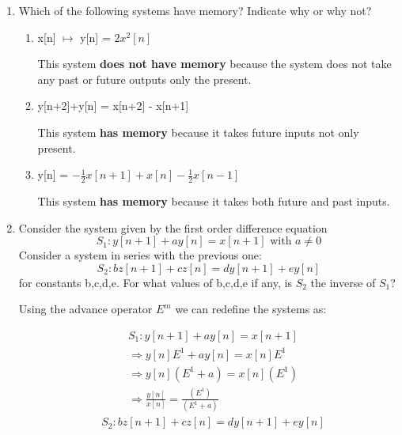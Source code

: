 \documentclass{article}
\begin{document}
\begin{enumerate}
    \item Which of the following systems have memory? Indicate why or why not?
    \begin{enumerate}
        \item x[n] $\mapsto$ y[n] = $2x^2[n]$
        \begin{center}
            This system \textbf{does not have memory} because the system does not take any past or future outputs only the present.
        \end{center}
        \item y[n+2]+y[n] = x[n+2] - x[n+1]
        \begin{center}
            This system \textbf{has memory} because it takes future inputs not only present.
        \end{center}
        \item y[n] = $-\frac{1}{2}x[n+1] +x[n] -\frac{1}{2}x[n-1]$
        \begin{center}
            This system \textbf{has memory} because it takes both future and past inputs.
        \end{center}
    \end{enumerate}
    \newpage
    \item Consider the system given by the first order difference equation
    \begin{equation}
        S_1: y[n+1]+ay[n]=x[n+1] \text{ with }a \ne 0
    \end{equation}
    Consider a system in series with the  previous one:
    \begin{equation}
        S_2: bz[n+1]+cz[n] = dy[n+1]+ey[n]
    \end{equation}
    for constants b,c,d,e. For what values of b,c,d,e if any, is $S_2$ the inverse of $S_1$?
    \begin{center}
        Using the advance operator $E^m$ we can redefine the systems as:
    \end{center}
    \begin{align}
        &S_1:y[n+1]+ay[n]=x[n+1]\\
        &\Rightarrow y[n]E^1+ay[n]=x[n]E^1\\
        &\Rightarrow y[n](E^1+a)=x[n](E^1)\\
        &\Rightarrow \frac{y[n]}{x[n]}=\frac{(E^1)}{(E^1+a)}
    \end{align}
    \begin{align}
        &S_2:bz[n+1]+cz[n] = dy[n+1]+ey[n]\\

\end{align}
\end{enumerate}
\end{document}

